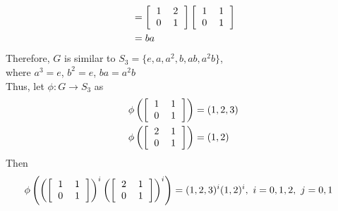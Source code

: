 \documentclass[paper=usletter, fontsize=12pt]{article}
\begin{document}
\begin{itemize}
\begin{itemize}
\begin{cproof}
\begin{align*}
                    & = \left[\begin{tabular}{cc}
                            1 & 2 \\
                            0 & 1
                    \end{tabular}\right]\left[\begin{tabular}{cc}
                            1 & 1 \\
                            0 & 1
                    \end{tabular}\right]\\
                    & = ba
                \end{align*}
                \endgroup
                Therefore, $G$ is similar to $S_3=\{e,a,a^2,b,ab,a^2b\}$,\\
                where $a^3=e$, $b^2=e$, $ba=a^2b$\\

                Thus, let $\phi: G \rightarrow S_3$ as
                \begin{align*}
                    \phi\left(\left[\begin{tabular}{cc}
                            1 & 1 \\
                            0 & 1
                    \end{tabular}\right]\right) & = (1,2,3)\\
                    \phi\left(\left[\begin{tabular}{cc}
                            2 & 1 \\
                            0 & 1
                    \end{tabular}\right]\right) & = (1,2)
                \end{align*}
                \endgroup
                Then
                \begin{align*}
                    \phi\left(\left(\left[\begin{tabular}{cc}
                            1 & 1 \\
                            0 & 1
                    \end{tabular}\right]\right)^i\left(\left[\begin{tabular}{cc}
                            2 & 1 \\
                            0 & 1
                    \end{tabular}\right]\right)^i\right) & = (1,2,3)^i(1,2)^i, \ i = 0,1,2, \ j = 0,1
                \end{align*}
                \endgroup


\end{cproof}
\end{itemize}
\end{itemize}
\end{document}
